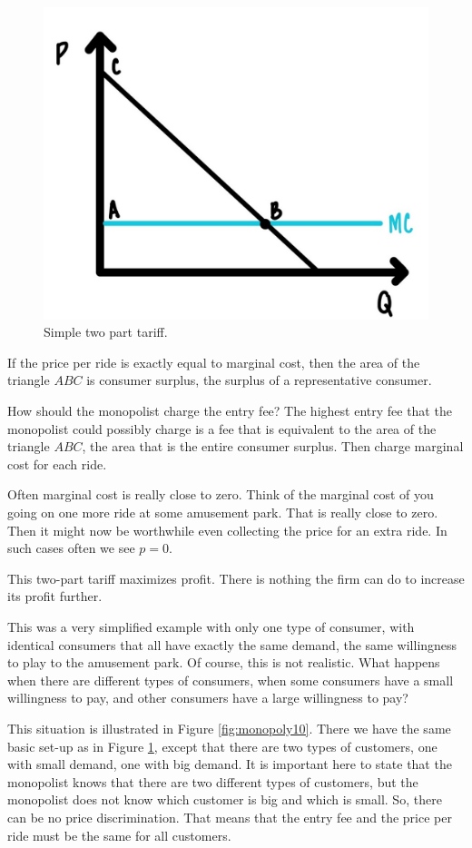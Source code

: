 \documentclass[
]{book}
\begin{document}
\begin{figure}

{\centering \includegraphics[width=0.75\linewidth]{img/monopoly/fig9} 

}

\caption{Simple two part tariff.}\label{fig:monopoly09}
\end{figure}

If the price per ride is exactly equal to marginal cost, then the area of the triangle \(ABC\) is consumer surplus, the surplus of a representative consumer.

How should the monopolist charge the entry fee? The highest entry fee that the monopolist could possibly charge is a fee that is equivalent to the area of the triangle \(ABC\), the area that is the entire consumer surplus. Then charge marginal cost for each ride.

Often marginal cost is really close to zero. Think of the marginal cost of you going on one more ride at some amusement park. That is really close to zero. Then it might now be worthwhile even collecting the price for an extra ride. In such cases often we see \(p = 0\).

This two-part tariff maximizes profit. There is nothing the firm can do to increase its profit further.

This was a very simplified example with only one type of consumer, with identical consumers that all have exactly the same demand, the same willingness to play to the amusement park. Of course, this is not realistic. What happens when there are different types of consumers, when some consumers have a small willingness to pay, and other consumers have a large willingness to pay?

This situation is illustrated in Figure \ref{fig:monopoly10}. There we have the same basic set-up as in Figure \ref{fig:monopoly09}, except that there are two types of customers, one with small demand, one with big demand. It is important here to state that the monopolist knows that there are two different types of customers, but the monopolist does not know which customer is big and which is small. So, there can be no price discrimination. That means that the entry fee and the price per ride must be the same for all customers.
\end{document}
